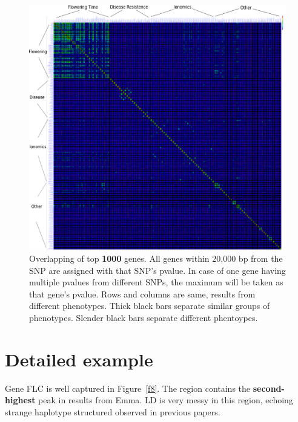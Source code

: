 \documentclass[a4paper,10pt]{article}
\begin{document}
\begin{figure}
  \includegraphics[width=1\textwidth]{figures/overlapping_results_a1000_inkscape.png}
  \caption{Overlapping of top \textbf{1000} genes. All genes within 20,000 bp from the SNP are assigned with that SNP's pvalue. In case of one gene having multiple pvalues from different SNPs, the maximum will be taken as that gene's pvalue. Rows and columns are same, results from different phenotypes. Thick black bars separate similar groups of phenotypes. Slender black bars separate different phentoypes.}\label{f7}
\end{figure}

\section{Detailed example}

Gene FLC is well captured in Figure~\ref{f8}. The region contains the \textbf{second-highest} peak in results from Emma. LD is very messy in this region, echoing strange haplotype structured observed in previous papers.
\end{document}

